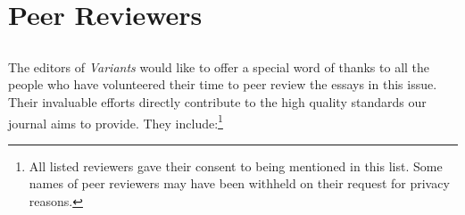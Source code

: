 \pagestyle{authors}
\chapter*{Peer Reviewers}
\protect\thispagestyle{chaptertitlepage}


\section*{}
The editors of \emph{Variants} would like to offer a special word of thanks to all the people who have volunteered their time to peer review the essays in this issue. Their invaluable efforts directly contribute to the high quality standards our journal aims to provide. They include:\footnote{All listed reviewers gave their consent to being mentioned in this list. Some names of peer reviewers may have been withheld on their request for privacy reasons.} 

